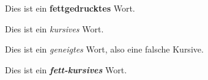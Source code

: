 \documentclass[12pt,ngerman]{scrartcl}
\begin{document}
Dies ist ein \textbf{fettgedrucktes} Wort.

Dies ist ein \textit{kursives} Wort.

Dies ist ein \textsl{geneigtes} Wort, also eine falsche Kursive.

Dies ist ein \textbf{\textit{fett-kursives}} Wort.
\end{document}
